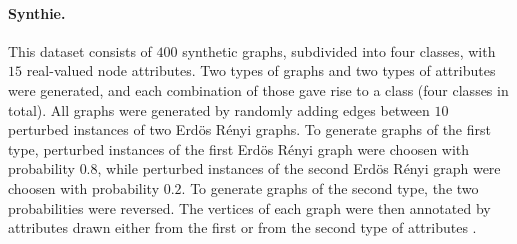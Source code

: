 \documentclass[twoside,11pt]{article}
\begin{document}
\paragraph{Synthie.} This dataset consists of $400$ synthetic graphs, subdivided into four classes, with $15$ real-valued node attributes.
Two types of graphs and two types of attributes were generated, and each combination of those gave rise to a class (four classes in total).
All graphs were generated by randomly adding edges between $10$ perturbed instances of two Erd{\"o}s R{\'e}nyi graphs.
To generate graphs of the first type, perturbed instances of the first Erd{\"o}s R{\'e}nyi graph were choosen with probability $0.8$, while perturbed instances of the second Erd{\"o}s R{\'e}nyi graph were choosen with probability $0.2$.
To generate graphs of the second type, the two probabilities were reversed.
The vertices of each graph were then annotated by attributes drawn either from the first or from the second type of attributes .
\end{document}
